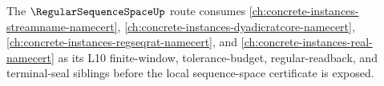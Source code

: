 The $\RegularSequenceSpaceUp$ route consumes \autoref{ch:concrete-instances-streamname-namecert}, \autoref{ch:concrete-instances-dyadicratcore-namecert}, \autoref{ch:concrete-instances-regseqrat-namecert}, and \autoref{ch:concrete-instances-real-namecert} as its L10 finite-window, tolerance-budget, regular-readback, and terminal-seal siblings before the local sequence-space certificate is exposed.

